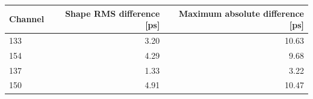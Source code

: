 \begin{tabular}{lrr}
\toprule
Channel & Shape RMS difference [ps] & Maximum absolute difference [ps]\\
\midrule
133 & 3.20 & 10.63\\
154 & 4.29 & 9.68\\
137 & 1.33 & 3.22\\
150 & 4.91 & 10.47\\
\bottomrule
\end{tabular}
